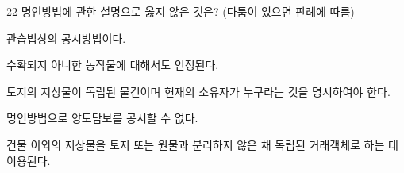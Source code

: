 \begin{question}{22}
명인방법에 관한 설명으로 옳지 않은 것은? (다툼이 있으면 판례에 따름)
\begin{choices}
  \item 관습법상의 공시방법이다.
  \item 수확되지 아니한 농작물에 대해서도 인정된다.
  \item 토지의 지상물이 독립된 물건이며 현재의 소유자가 누구라는 것을 명시하여야 한다.
  \item 명인방법으로 양도담보를 공시할 수 없다.
  \item 건물 이외의 지상물을 토지 또는 원물과 분리하지 않은 채 독립된 거래객체로 하는 데 이용된다.
\end{choices}
\end{question}
